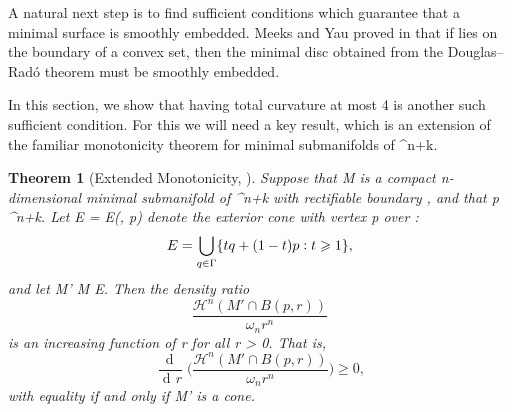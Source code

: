 \documentclass[a4paper, 11pt]{article}
\theoremstyle{plain}
\newtheorem{theorem}{Theorem}[section]
\theoremstyle{definition}
\theoremstyle{remark}
\DeclareMathOperator{\diff}{d \!}
\numberwithin{equation}{subsection}
\def\({}
\def\){}
\def\pi{}
\begin{document}
A natural next step is to find sufficient conditions which guarantee that a minimal surface is smoothly embedded. Meeks and Yau proved in \cite{MY82} that if \(\Gamma\) lies on the boundary of a convex set, then the minimal disc obtained from the Douglas--Rad{\'o} theorem must be smoothly embedded. 

In this section, we show that \(\Gamma\) having total curvature at most \(4\pi\) is another such sufficient condition. For this we will need a key result, which is an extension of the familiar monotonicity theorem for minimal submanifolds of \(^{n+k}\).

\begin{theorem}[{Extended Monotonicity, \cite[Theorem 5]{Whi16}}]
\label{Extended Monotonicity}
Suppose that \(M\) is a compact \(n\)-dimensional minimal submanifold of \(^{n+k}\) with rectifiable boundary \(\Gamma\), and that \(p \in {}^{n+k}\). Let \(E = E(\Gamma, p)\) denote the \emph{exterior cone} with vertex \(p\) over \(\Gamma\):
\begin{equation}
E = \bigcup_{q \in \Gamma}\{tq + (1-t)p \vcentcolon t \geqslant 1\},
\end{equation}
and let \(M' \coloneq M \cup E\). Then the density ratio
\begin{equation}
\frac{\mathcal{H}^{n}(M' \cap B(p,r))}{\omega_{n}r^{n}}
\end{equation}
is an increasing function of \(r\) for all \(r > 0\). That is,
\begin{equation}
\frac{\!\diff}{\diff r}\bigg(\frac{\mathcal{H}^{n}(M' \cap B(p,r))}{\omega_{n}r^{n}}\bigg) \geqslant 0,
\end{equation}
with equality if and only if \(M'\) is a cone.
\end{theorem}
\end{document}

